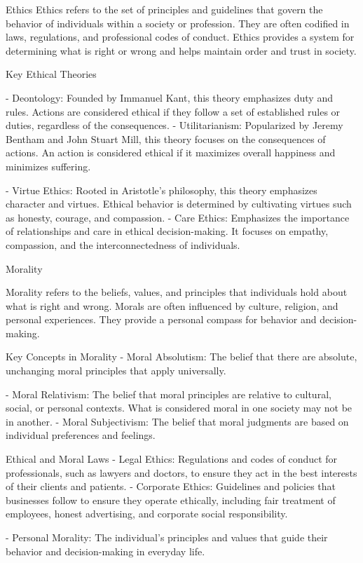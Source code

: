 \documentclass[12pt,letterpaper]{article}
\begin{document}
Ethics
Ethics refers to the set of principles and guidelines that govern the behavior of individuals within a society or profession. They are often codified in laws, regulations, and professional codes of conduct. Ethics provides a system for determining what is right or wrong and helps maintain order and trust in society.

 				Key Ethical Theories

- Deontology: Founded by Immanuel Kant, this theory emphasizes duty and rules. Actions are considered ethical if they follow a set of established rules or duties, regardless of the consequences.
- Utilitarianism: Popularized by Jeremy Bentham and John Stuart Mill, this theory focuses on the consequences of actions. An action is considered ethical if it maximizes overall happiness and minimizes suffering.

- Virtue Ethics: Rooted in Aristotle's philosophy, this theory emphasizes character and virtues. Ethical behavior is determined by cultivating virtues such as honesty, courage, and compassion.
- Care Ethics: Emphasizes the importance of relationships and care in ethical decision-making. It focuses on empathy, compassion, and the interconnectedness of individuals.

 					Morality

Morality refers to the beliefs, values, and principles that individuals hold about what is right and wrong. Morals are often influenced by culture, religion, and personal experiences. They provide a personal compass for behavior and decision-making.

 Key Concepts in Morality
- Moral Absolutism: The belief that there are absolute, unchanging moral principles that apply universally.

- Moral Relativism: The belief that moral principles are relative to cultural, social, or personal contexts. What is considered moral in one society may not be in another.
- Moral Subjectivism: The belief that moral judgments are based on individual preferences and feelings.

 				Ethical and Moral Laws
- Legal Ethics: Regulations and codes of conduct for professionals, such as lawyers and doctors, to ensure they act in the best interests of their clients and patients.
- Corporate Ethics: Guidelines and policies that businesses follow to ensure they operate ethically, including fair treatment of employees, honest advertising, and corporate social responsibility.

- Personal Morality: The individual's principles and values that guide their behavior and decision-making in everyday life.
\end{document}
